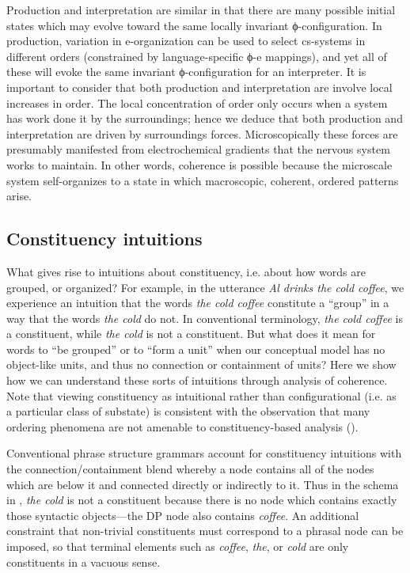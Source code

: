   Production and interpretation are similar in that there are many possible initial states which may evolve toward the same locally invariant ϕ-configuration. In production, variation in e-organization can be used to select cs-systems in different orders (constrained by language-specific ϕ-e mappings), and yet all of these will evoke the same invariant ϕ-configuration for an interpreter. It is important to consider that both production and interpretation are involve local increases in order. The local concentration of order only occurs when a system has work done it by the surroundings; hence we deduce that both production and interpretation are driven by surroundings forces. Microscopically these forces are presumably manifested from electrochemical gradients that the nervous system works to maintain. In other words, coherence is possible because the microscale system self-organizes to a state in which macroscopic, coherent, ordered patterns arise.

\subsection{Constituency intuitions}

What gives rise to intuitions about constituency, i.e. about how words are grouped, or organized? For example, in the utterance \textit{Al drinks the cold coffee}, we experience an intuition that the words \textit{the cold coffee} constitute a “group” in a way that the words \textit{the cold} do not. In conventional terminology, \textit{the cold coffee} is a constituent, while \textit{the cold} is not a constituent. But what does it mean for words to “be grouped” or to “form a unit” when our conceptual model has no object-like units, and thus no connection or containment of units? Here we show how we can understand these sorts of intuitions through analysis of coherence. Note that viewing constituency as intuitional rather than configurational (i.e. as a particular class of substate) is consistent with the observation that many ordering phenomena are not amenable to constituency-based analysis (\citealt{Langacker1997,Phillips2003}).

  Conventional phrase structure grammars account for constituency intuitions with the connection/containment blend whereby a node contains all of the nodes which are below it and connected directly or indirectly to it. Thus in the schema in {}, \textit{the cold} is not a constituent because there is no node which contains exactly those syntactic objects—the DP node also contains \textit{coffee}. An additional constraint that non-trivial constituents must correspond to a phrasal node can be imposed, so that terminal elements such as \textit{coffee}, \textit{the}, or \textit{cold} are only constituents in a vacuous sense. 

